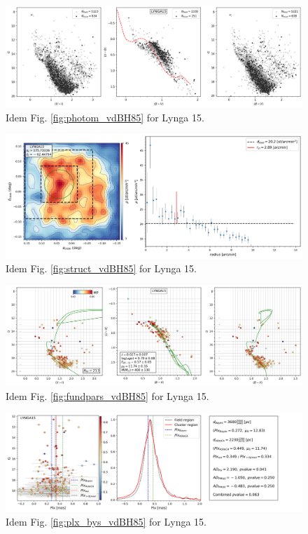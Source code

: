 \documentclass[draft]{aa}
\begin{document}
\begin{figure}[ht]
    \centering
    \includegraphics[width=\hsize]{../figs/obs_LYNGA15.png}
    \caption{Idem Fig. \ref{fig:photom_vdBH85} for Lynga 15.}
    \label{fig51}
\end{figure}
\begin{figure}[ht]
    \centering
    \includegraphics[width=\hsize]{../figs/dmap_lynga15.png}
    \caption{Idem Fig. \ref{fig:struct_vdBH85} for Lynga 15.}
    \label{fig52}
\end{figure}
\begin{figure}[ht]
    \centering
    \includegraphics[width=\hsize]{../figs/cmds_lynga15.png}
    \caption{Idem Fig. \ref{fig:fundpars_vdBH85} for Lynga 15.}
    \label{fig53}
\end{figure}
\begin{figure}[ht]
    \centering
    \includegraphics[width=\hsize]{../figs/plx_LYNGA15.png}
    \caption{Idem Fig. \ref{fig:plx_bys_vdBH85} for Lynga 15.}
    \label{fig54}
\end{figure}
\end{document}

